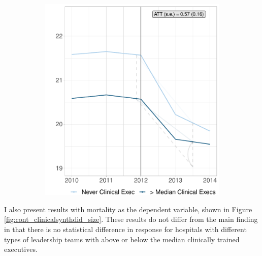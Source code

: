 \documentclass[12pt]{article}
\begin{document}
\begin{figure}[ht!]
\begin{subfigure}[b]{0.45\textwidth}
         \includegraphics[width=\textwidth]{Objects/cont_abovemedread_md_nomd_size_synth_graph.pdf}
         \label{fig:abovemed_read_synth_clinical}
     \end{subfigure}
        \label{fig:cont_clinicalsynthdid_read_size}
    \end{figure}

    I also present results with mortality as the dependent variable, shown in Figure \ref{fig:cont_clinicalsynthdid_size}. These results do not differ from the main finding in that there is no statistical difference in response for hospitals with different types of leadership teams with above or below the median clinically trained executives. 
\end{document}
